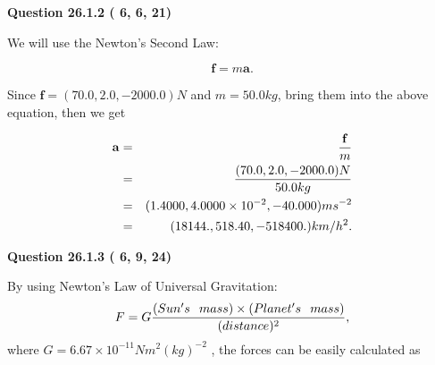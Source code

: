 \documentclass[12pt]{article}
\begin{document}
{\textbf{\Large{Question
26.1.2 
 (          6,          6,         21)
}}}
  
  
 
 
\noindent{}

We will use the Newton's Second Law:
 
\[
\mathbf{f}=m\mathbf{a}.
\]
 
Since $\mathbf{f}=( %
70.0,  %
2.0,  %
-2000.0 )N$
and $m= %
50.0 kg$, bring them into the above equation, then we get
 
\begin{eqnarray*}
\mathbf{a}&=&\frac{\mathbf{f}}m  \\
&=&\frac{(
70.0 ,
2.0 ,
-2000.0 )N
}{ %
50.0 kg}  \\
&=&(
1.4000 ,
4.0000 \times 10^{-2},
-40.000
)ms^{-2} \\
&=&(
18144. ,
518.40 ,
-518400.
)km/h^2.
\end{eqnarray*}
 
 
 
  
\vspace{0.2in}
  
{\textbf{\Large{Question
26.1.3 
 (          6,          9,         24)
}}}
  
  
 
 
\noindent{}

By using Newton's Law of Universal Gravitation:
\[
F=G \frac{(Sun's \hspace{0.1in} mass) \times (Planet's \hspace{0.1in} mass)} { (distance)^2},
\]
where
$ G= %
6.67 \times 10^{-11} N m^{2}(kg)^{-2}$ , the forces can be easily calculated as
 
\vspace{0.2in}
 
\end{document}
